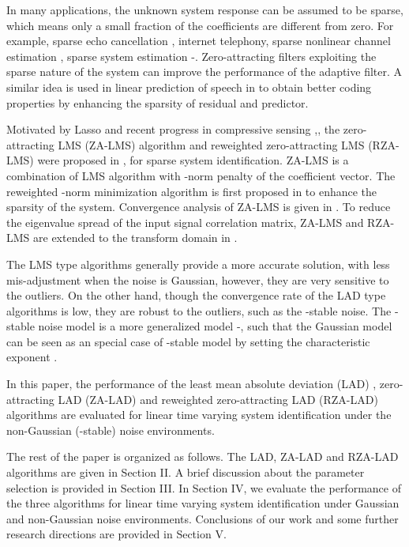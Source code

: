 \documentclass[conference]{IEEEtran}
\begin{document}
In many applications, the unknown system response can be assumed to be sparse, which means only a small fraction of the coefficients are different from zero. For example,  sparse echo cancellation \cite{ref20}, internet  telephony, sparse nonlinear channel estimation \cite{ref33}, sparse system estimation \cite{ref34}-\cite{ref35}. Zero-attracting filters exploiting the sparse nature of the system can improve the  performance of the adaptive filter. A similar idea is used in linear prediction of speech in \cite{ref36} to obtain better coding properties by enhancing the sparsity of residual and predictor.  

Motivated by Lasso \cite{ref10} and recent progress in compressive
sensing \cite{ref11},\cite{ref12}, the zero-attracting LMS (ZA-LMS) algorithm and reweighted  zero-attracting LMS (RZA-LMS) were proposed in \cite{ref24},  for sparse system identification.  ZA-LMS is a combination of LMS algorithm with -norm penalty of the coefficient vector. The reweighted -norm minimization algorithm is first proposed in \cite{refrl} to enhance the sparsity of the system. Convergence analysis of ZA-LMS is given in \cite{ref25}. To reduce the eigenvalue spread of the input signal correlation matrix, ZA-LMS and RZA-LMS are extended to the transform domain in \cite{ref26}. 

The LMS type algorithms generally provide a more accurate solution, with less mis-adjustment when the noise is Gaussian, however, they are very sensitive to the outliers. On the other hand, though the convergence rate of the LAD type algorithms is low,  they are robust to the outliers, such as the -stable noise. The -stable noise model is a more generalized model \cite{ref6lmp}-\cite{ref7lmpsi}, such that the Gaussian model can be seen as an special case of -stable model by setting the characteristic exponent .

In this paper, the performance of the least mean absolute deviation (LAD) \cite{ref6lmp}, zero-attracting LAD (ZA-LAD) \cite{ref32} and reweighted  zero-attracting LAD (RZA-LAD) algorithms are evaluated for linear time varying system identification under the non-Gaussian (-stable)  noise environments. 

The rest of the paper is organized as follows. The LAD, ZA-LAD and RZA-LAD algorithms are given in Section II. A brief discussion about the parameter selection is provided in Section III. In Section IV, we evaluate the performance of the three algorithms for linear time varying system identification under Gaussian and non-Gaussian noise environments.  Conclusions of our work and  some further research directions are provided in Section V.
\end{document}
